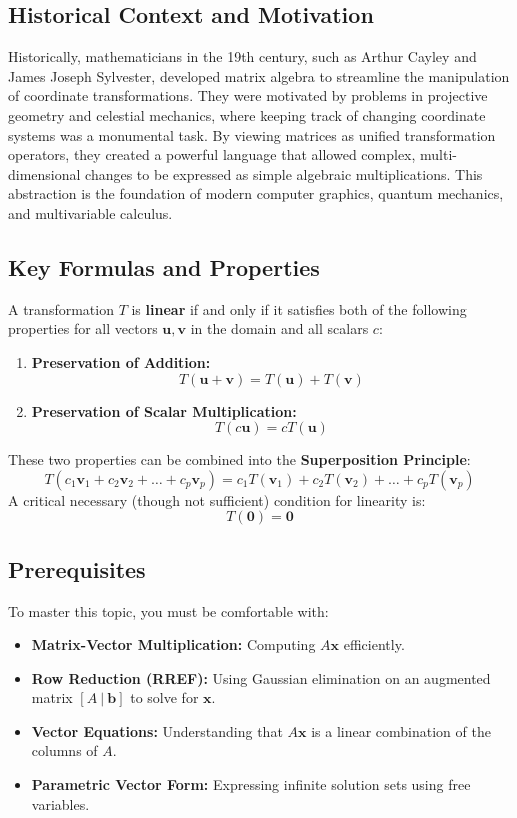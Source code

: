 \documentclass[11pt]{article}
\begin{document}
\subsection{Historical Context and Motivation}
Historically, mathematicians in the 19th century, such as Arthur Cayley and James Joseph Sylvester, developed matrix algebra to streamline the manipulation of coordinate transformations. They were motivated by problems in projective geometry and celestial mechanics, where keeping track of changing coordinate systems was a monumental task. By viewing matrices as unified transformation operators, they created a powerful language that allowed complex, multi-dimensional changes to be expressed as simple algebraic multiplications. This abstraction is the foundation of modern computer graphics, quantum mechanics, and multivariable calculus.

\subsection{Key Formulas and Properties}
A transformation $T$ is \textbf{linear} if and only if it satisfies both of the following properties for all vectors $\mathbf{u}, \mathbf{v}$ in the domain and all scalars $c$:
\begin{enumerate}
    \item \textbf{Preservation of Addition:} \[ T(\mathbf{u} + \mathbf{v}) = T(\mathbf{u}) + T(\mathbf{v}) \]
    \item \textbf{Preservation of Scalar Multiplication:} \[ T(c\mathbf{u}) = cT(\mathbf{u}) \]
\end{enumerate}
These two properties can be combined into the \textbf{Superposition Principle}:
\[ T(c_1\mathbf{v}_1 + c_2\mathbf{v}_2 + \dots + c_p\mathbf{v}_p) = c_1T(\mathbf{v}_1) + c_2T(\mathbf{v}_2) + \dots + c_pT(\mathbf{v}_p) \]
A critical necessary (though not sufficient) condition for linearity is:
\[ T(\mathbf{0}) = \mathbf{0} \]

\subsection{Prerequisites}
To master this topic, you must be comfortable with:
\begin{itemize}
    \item \textbf{Matrix-Vector Multiplication:} Computing $A\mathbf{x}$ efficiently.
    \item \textbf{Row Reduction (RREF):} Using Gaussian elimination on an augmented matrix $[A \ | \ \mathbf{b}]$ to solve for $\mathbf{x}$.
    \item \textbf{Vector Equations:} Understanding that $A\mathbf{x}$ is a linear combination of the columns of $A$.
    \item \textbf{Parametric Vector Form:} Expressing infinite solution sets using free variables.
\end{itemize}
\end{document}
